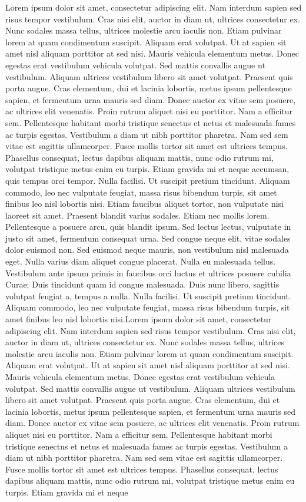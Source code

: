 Lorem ipsum dolor sit amet, consectetur adipiscing elit. Nam interdum sapien sed risus tempor vestibulum. Cras nisi elit, auctor in diam ut, ultrices consectetur ex. Nunc sodales massa tellus, ultrices molestie arcu iaculis non. Etiam pulvinar lorem at quam condimentum suscipit. Aliquam erat volutpat. Ut at sapien sit amet nisl aliquam porttitor at sed nisi. Mauris vehicula elementum metus. Donec egestas erat vestibulum vehicula volutpat. Sed mattis convallis augue ut vestibulum. Aliquam ultrices vestibulum libero sit amet volutpat. Praesent quis porta augue. Cras elementum, dui et lacinia lobortis, metus ipsum pellentesque sapien, et fermentum urna mauris sed diam. Donec auctor ex vitae sem posuere, ac ultrices elit venenatis. Proin rutrum aliquet nisi eu porttitor. Nam a efficitur sem. Pellentesque habitant morbi tristique senectus et netus et malesuada fames ac turpis egestas. Vestibulum a diam ut nibh porttitor pharetra. Nam sed sem vitae est sagittis ullamcorper. Fusce mollis tortor sit amet est ultrices tempus. Phasellus consequat, lectus dapibus aliquam mattis, nunc odio rutrum mi, volutpat tristique metus enim eu turpis. Etiam gravida mi et neque accumsan, quis tempus orci tempor. Nulla facilisi. Ut suscipit pretium tincidunt. Aliquam commodo, leo nec vulputate feugiat, massa risus bibendum turpis, sit amet finibus leo nisl lobortis nisi. Etiam faucibus aliquet tortor, non vulputate nisi laoreet sit amet. Praesent blandit varius sodales. Etiam nec mollis lorem. Pellentesque a posuere arcu, quis blandit ipsum. Sed lectus lectus, vulputate in justo sit amet, fermentum consequat urna. Sed congue neque elit, vitae sodales dolor euismod non. Sed euismod neque mauris, non vestibulum nisl malesuada eget. Nulla varius diam aliquet congue placerat. Nulla eu malesuada tellus. Vestibulum ante ipsum primis in faucibus orci luctus et ultrices posuere cubilia Curae; Duis tincidunt quam id congue malesuada. Duis nunc libero, sagittis volutpat feugiat a, tempus a nulla. Nulla facilisi. Ut suscipit pretium tincidunt. Aliquam commodo, leo nec vulputate feugiat, massa risus bibendum turpis, sit amet finibus leo nisl lobortis nisi.Lorem ipsum dolor sit amet, consectetur adipiscing elit. Nam interdum sapien sed risus tempor vestibulum. Cras nisi elit, auctor in diam ut, ultrices consectetur ex. Nunc sodales massa tellus, ultrices molestie arcu iaculis non. Etiam pulvinar lorem at quam condimentum suscipit. Aliquam erat volutpat. Ut at sapien sit amet nisl aliquam porttitor at sed nisi. Mauris vehicula elementum metus. Donec egestas erat vestibulum vehicula volutpat. Sed mattis convallis augue ut vestibulum. Aliquam ultrices vestibulum libero sit amet volutpat. Praesent quis porta augue. Cras elementum, dui et lacinia lobortis, metus ipsum pellentesque sapien, et fermentum urna mauris sed diam. Donec auctor ex vitae sem posuere, ac ultrices elit venenatis. Proin rutrum aliquet nisi eu porttitor. Nam a efficitur sem. Pellentesque habitant morbi tristique senectus et netus et malesuada fames ac turpis egestas. Vestibulum a diam ut nibh porttitor pharetra. Nam sed sem vitae est sagittis ullamcorper. Fusce mollis tortor sit amet est ultrices tempus. Phasellus consequat, lectus dapibus aliquam mattis, nunc odio rutrum mi, volutpat tristique metus enim eu turpis. Etiam gravida mi et neque 